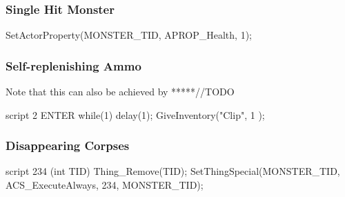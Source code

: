 		\subsubsection*{Single Hit Monster}
			\begin{clinee}
SetActorProperty(MONSTER_TID, APROP_Health, 1);
			\end{clinee}
		\subsubsection*{Self-replenishing Ammo}
		Note that this can also be achieved by  *****//TODO
			\begin{clinee}
script 2 ENTER
{   
    while(1)
    {
        delay(1);
        GiveInventory("Clip", 1 );
    }
}
			\end{clinee}
		\subsubsection*{Disappearing Corpses}
			\begin{clinee}
script 234 (int TID)
{
	Thing_Remove(TID);
}
SetThingSpecial(MONSTER_TID, ACS_ExecuteAlways, 234, MONSTER_TID);
			\end{clinee}
